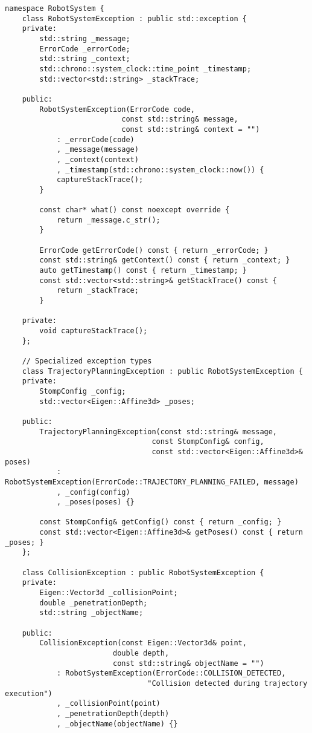 \begin{lstlisting}[caption={Comprehensive Exception Hierarchy}, label={lst:exception_hierarchy}]
namespace RobotSystem {
    class RobotSystemException : public std::exception {
    private:
        std::string _message;
        ErrorCode _errorCode;
        std::string _context;
        std::chrono::system_clock::time_point _timestamp;
        std::vector<std::string> _stackTrace;
        
    public:
        RobotSystemException(ErrorCode code, 
                           const std::string& message,
                           const std::string& context = "")
            : _errorCode(code)
            , _message(message)
            , _context(context)
            , _timestamp(std::chrono::system_clock::now()) {
            captureStackTrace();
        }
        
        const char* what() const noexcept override { 
            return _message.c_str(); 
        }
        
        ErrorCode getErrorCode() const { return _errorCode; }
        const std::string& getContext() const { return _context; }
        auto getTimestamp() const { return _timestamp; }
        const std::vector<std::string>& getStackTrace() const { 
            return _stackTrace; 
        }
        
    private:
        void captureStackTrace();
    };
    
    // Specialized exception types
    class TrajectoryPlanningException : public RobotSystemException {
    private:
        StompConfig _config;
        std::vector<Eigen::Affine3d> _poses;
        
    public:
        TrajectoryPlanningException(const std::string& message,
                                  const StompConfig& config,
                                  const std::vector<Eigen::Affine3d>& poses)
            : RobotSystemException(ErrorCode::TRAJECTORY_PLANNING_FAILED, message)
            , _config(config)
            , _poses(poses) {}
            
        const StompConfig& getConfig() const { return _config; }
        const std::vector<Eigen::Affine3d>& getPoses() const { return _poses; }
    };
    
    class CollisionException : public RobotSystemException {
    private:
        Eigen::Vector3d _collisionPoint;
        double _penetrationDepth;
        std::string _objectName;
        
    public:
        CollisionException(const Eigen::Vector3d& point, 
                         double depth,
                         const std::string& objectName = "")
            : RobotSystemException(ErrorCode::COLLISION_DETECTED,
                                 "Collision detected during trajectory execution")
            , _collisionPoint(point)
            , _penetrationDepth(depth)
            , _objectName(objectName) {}
            

\end{lstlisting}

